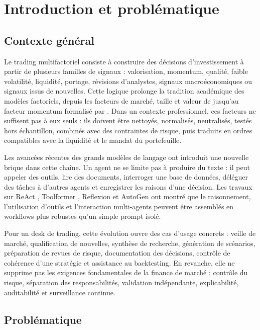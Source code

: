 \chapter{Introduction et problématique}\label{cap:introduction}

\section{Contexte général}

Le trading multifactoriel consiste à construire des décisions d'investissement à partir de plusieurs familles de signaux : valorisation, momentum, qualité, faible volatilité, liquidité, portage, révisions d'analystes, signaux macroéconomiques ou signaux issus de nouvelles. Cette logique prolonge la tradition académique des modèles factoriels, depuis les facteurs de marché, taille et valeur de \citet{famaFrench1993} jusqu'au facteur momentum formalisé par \citet{carhart1997}. Dans un contexte professionnel, ces facteurs ne suffisent pas à eux seuls : ils doivent être nettoyés, normalisés, neutralisés, testés hors échantillon, combinés avec des contraintes de risque, puis traduits en ordres compatibles avec la liquidité et le mandat du portefeuille.

Les avancées récentes des grands modèles de langage ont introduit une nouvelle brique dans cette chaîne. Un agent ne se limite pas à produire du texte : il peut appeler des outils, lire des documents, interroger une base de données, déléguer des tâches à d'autres agents et enregistrer les raisons d'une décision. Les travaux sur ReAct \citep{yao2023react}, Toolformer \citep{schick2023toolformer}, Reflexion \citep{shinn2023reflexion} et AutoGen \citep{wu2023autogen} ont montré que le raisonnement, l'utilisation d'outils et l'interaction multi-agents peuvent être assemblés en workflows plus robustes qu'un simple prompt isolé.

Pour un desk de trading, cette évolution ouvre des cas d'usage concrets : veille de marché, qualification de nouvelles, synthèse de recherche, génération de scénarios, préparation de revues de risque, documentation des décisions, contrôle de cohérence d'une stratégie et assistance au backtesting. En revanche, elle ne supprime pas les exigences fondamentales de la finance de marché : contrôle du risque, séparation des responsabilités, validation indépendante, explicabilité, auditabilité et surveillance continue.

\section{Problématique}

